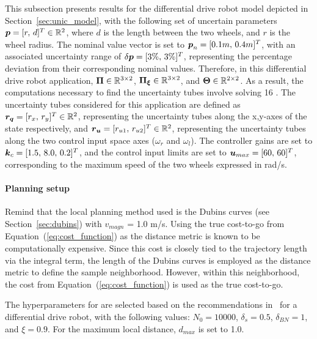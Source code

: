 This subsection presents results for the differential drive robot model depicted in Section~\ref{sec:unic_model}, with the following set of uncertain parameters $\boldsymbol{p} = [r, \, d]^T \in \mathbb{R}^{2}$, where $d$ is the length between the two wheels, and $r$ is the wheel radius.
The nominal value vector is set to $\boldsymbol{p}_n = [0.1m, \, 0.4m]^T$, with an associated uncertainty range of $\delta\boldsymbol{p} = [3\%, \, 3\%]^T$, representing the percentage deviation from their corresponding nominal values.
Therefore, in this differential drive robot application, $\boldsymbol{\Pi} \in \mathbb{R}^{3\times2}$, $\boldsymbol{\Pi_{\xi}}\in \mathbb{R}^{3\times2}$, and $\boldsymbol{\Theta} \in \mathbb{R}^{2\times2}$.
As a result, the computations necessary to find the uncertainty tubes involve solving 16 .
The uncertainty tubes considered for this application are defined as $\boldsymbol{r_q} = [r_x, \, r_y]^T \in \mathbb{R}^2$, representing the uncertainty tubes along the x,y-axes of the state respectively, and $\boldsymbol{r_u} = [r_{u1}, \, r_{u2}]^T \in \mathbb{R}^2$, representing the uncertainty tubes along the two control input space axes ($\omega_r$ and $\omega_l$).
The controller gains are set to $\boldsymbol{k}_c = [1.5, \, 8.0, \, 0.2]^T$, and the control input limits are set to $\boldsymbol{u}_{max} = [60, \, 60]^T$, corresponding to the maximum speed of the two wheels expressed in rad/s.

\paragraph{Planning setup}

Remind that the local planning method used is the Dubins curves (see Section~\ref{sec:dubins}) with $v_{magn}$ = 1.0 m/s. 
Using the true cost-to-go from Equation~(\ref{eq:cost_function}) as the distance metric is known to be computationally expensive. 
Since this cost is closely tied to the trajectory length via the integral term, the length of the Dubins curves is employed as the distance metric to define the sample neighborhood. 
However, within this neighborhood, the cost from Equation~(\ref{eq:cost_function}) is used as the true cost-to-go.

The hyperparameters for  are selected based on the recommendations in~\cite{cSST} for a differential drive robot, with the following values: $N_0 = 10000$, $\delta_s = 0.5$, $\delta_{BN} = 1$, and $\xi = 0.9$.
For the maximum local distance, $d_{max}$ is set to 1.0.

